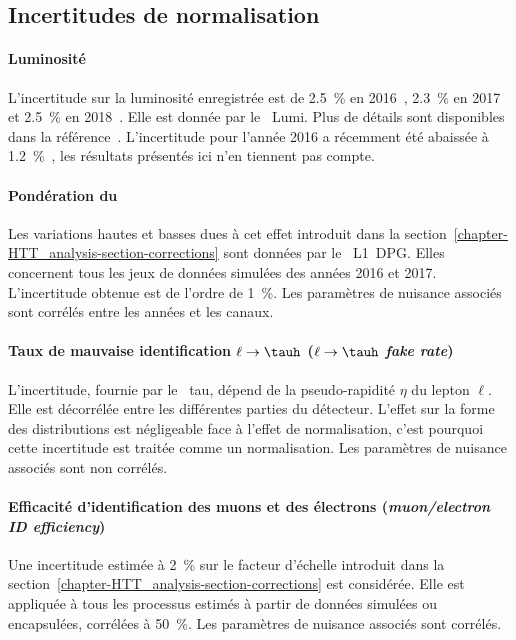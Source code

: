 \subsection{Incertitudes de normalisation}\label{chapter-HTT_analysis-section-systematics-normalization}
\paragraph{Luminosité}
L'incertitude sur la luminosité enregistrée est de
\SI{2.5}{\%} en 2016~\cite{CMS-PAS-LUM-17-001},
\SI{2.3}{\%} en 2017~\cite{CMS-PAS-LUM-17-004} et
\SI{2.5}{\%} en 2018~\cite{CMS-PAS-LUM-18-002}.
Elle est donnée par le \POG\ Lumi.
Plus de détails sont disponibles dans la référence~\cite{LumiTwiki}.
L'incertitude pour l'année 2016 a récemment été abaissée à \SI{1.2}{\%}~\cite{CMS-PAS-LUM-17-003},
les résultats présentés ici n'en tiennent pas compte.
\paragraph{Pondération du \prefiring}
Les variations hautes et basses dues à cet effet introduit dans la section~\ref{chapter-HTT_analysis-section-corrections} sont données par le \POG\ L1~DPG.
Elles concernent tous les jeux de données simulées des années 2016 et 2017.
L'incertitude obtenue est de l'ordre de \SI{1}{\%}.
Les paramètres de nuisance associés sont corrélés entre les années et les canaux.
\paragraph{Taux de mauvaise identification $\ell\to\tauh$ (\emph{$\ell\to\tauh$ fake rate})}
L'incertitude, fournie par le \POG\ tau, dépend de la pseudo-rapidité $\eta$ du lepton $\ell$.
Elle est décorrélée entre les différentes parties du détecteur.
L'effet sur la forme des distributions est négligeable face à l'effet de normalisation, c'est pourquoi cette incertitude est traitée comme un normalisation.
Les paramètres de nuisance associés sont non corrélés.
\paragraph{Efficacité d'identification des muons et des électrons (\emph{muon/electron ID efficiency})}
Une incertitude estimée à \SI{2}{\%} sur le facteur d'échelle introduit dans la section~\ref{chapter-HTT_analysis-section-corrections} est considérée.
Elle est appliquée à tous les processus estimés à partir de données simulées ou encapsulées, corrélées à \SI{50}{\%}.
Les paramètres de nuisance associés sont corrélés.
